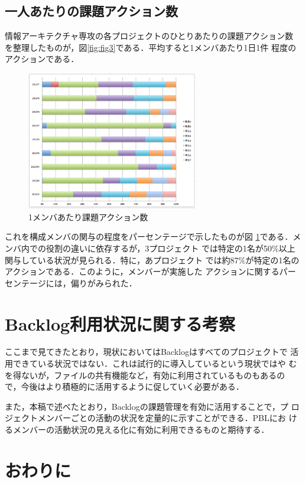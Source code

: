 \documentclass[submit,techreq,noauthor]{ipsj}
\begin{document}
\subsection{一人あたりの課題アクション数}
情報アーキテクチャ専攻の各プロジェクトのひとりあたりの課題アクション数
を整理したものが，図\ref{fig:fig3}である．平均すると1メンバあたり1日1件
程度のアクションである．

\begin{figure}[tb]
\begin{center}
\includegraphics[width=7.5cm]{./figure/fig4.eps}
\end{center}
\caption{1メンバあたり課題アクション数}
\label{fig:fig4}
\end{figure}

これを構成メンバの関与の程度をパーセンテージで示したものが図
\ref{fig:fig4}である．メンバ内での役割の違いに依存するが，3プロジェクト
では特定の1名が50\%以上関与している状況が見られる．特に，あプロジェクト
では約87\%が特定の1名のアクションである．このように，メンバーが実施した
アクションに関するパーセンテージには，偏りがみられた．

\section{Backlog利用状況に関する考察}
ここまで見てきたとおり，現状においてはBacklogはすべてのプロジェクトで
活用できている状況ではない．これは試行的に導入しているという現状ではや
むを得ないが，ファイルの共有機能など，有効に利用されているものもあるの
で，今後はより積極的に活用するように促していく必要がある．

また，本稿で述べたとおり，Backlogの課題管理を有効に活用することで，プ
ロジェクトメンバーごとの活動の状況を定量的に示すことができる．PBLにお
けるメンバーの活動状況の見える化に有効に利用できるものと期待する．

\section{おわりに}
\end{document}
